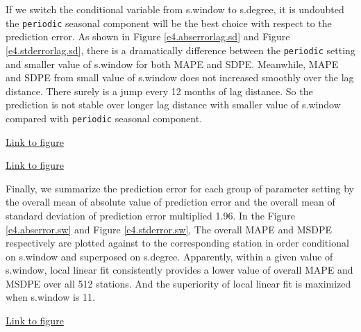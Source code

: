 If we switch the conditional 
variable from s.window to s.degree, it is undoubted the \texttt{periodic} seasonal
component will be the best choice with respect to the prediction error. As shown
in Figure \href{../plots/a1950/E4/tmax.absmeans.vs.lag.sd.pdf}
{\ref*{e4.abserrorlag.sd}} and Figure 
\href{../plots/a1950/E4/tmax.std.vs.lag.sd.pdf}{\ref*{e4.stderrorlag.sd}}, there
is a dramatically difference between the \texttt{periodic} setting and smaller 
value of s.window for both MAPE and SDPE. Meanwhile, MAPE and SDPE from small 
value of s.window does not increased smoothly over the lag distance. There 
surely is a jump every 12 months of lag distance. So the prediction is not stable
over longer lag distance with smaller value of s.window compared with 
\texttt{periodic} seasonal component.

\begin{framed}
\begin{center}
  \href{../plots/a1950/E4/tmax.absmeans.vs.lag.sd.pdf}{Link to figure}
  \label{e4.abserrorlag.sd}
\end{center}
\end{framed}

\begin{framed}
\begin{center}
  \href{../plots/a1950/E4/tmax.std.vs.lag.sd.pdf}{Link to figure}
  \label{e4.stderrorlag.sd}
\end{center}
\end{framed}

Finally, we summarize the prediction error for each group of parameter setting
by the overall mean of absolute value of prediction error and the overall mean
of standard deviation of prediction error multiplied 1.96. In the Figure 
\href{../plots/a1950/E4/tmax.mean.absmeans.error.sw.pdf}{\ref*{e4.abserror.sw}}
and Figure \href{../plots/a1950/E4/tmax.mean.std.error.sw.pdf}
{\ref*{e4.stderror.sw}}, The overall MAPE and MSDPE respectively are plotted 
against to the corresponding station in order conditional on s.window and 
superposed on s.degree. Apparently, within a given value of s.window, local linear
fit consistently provides a lower value of overall MAPE and MSDPE over all 512 
stations. And the superiority of local linear fit is maximized when s.window is
11.

\begin{framed}
\begin{center}
  \href{../plots/a1950/E4/tmax.mean.absmeans.error.sw.pdf}{Link to figure}
  \label{e4.abserror.sw}
\end{center}
\end{framed}


